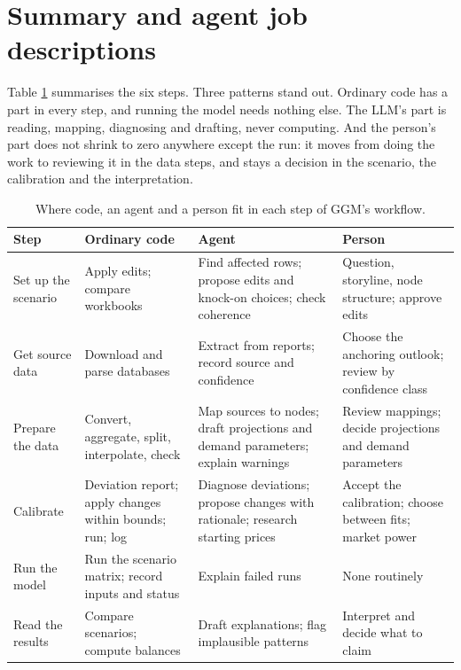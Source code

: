 \section{Summary and agent job descriptions}

Table \ref{tab:where-ai-fits} summarises the six steps.
Three patterns stand out.
Ordinary code has a part in every step, and running the model needs nothing else.
The LLM's part is reading, mapping, diagnosing and drafting, never computing.
And the person's part does not shrink to zero anywhere except the run: it moves from doing the work to reviewing it in the data steps, and stays a decision in the scenario, the calibration and the interpretation.

\begin{table}[htbp]
\centering
\small
\caption{Where code, an agent and a person fit in each step of GGM's workflow.}
\label{tab:where-ai-fits}
\begin{tabularx}{\textwidth}{@{}l>{\raggedright\arraybackslash}X>{\raggedright\arraybackslash}X>{\raggedright\arraybackslash}X@{}}
\toprule
Step & Ordinary code & Agent & Person \\
\midrule
Set up the scenario & Apply edits; compare workbooks & Find affected rows; propose edits and knock-on choices; check coherence & Question, storyline, node structure; approve edits \\
Get source data & Download and parse databases & Extract from reports; record source and confidence & Choose the anchoring outlook; review by confidence class \\
Prepare the data & Convert, aggregate, split, interpolate, check & Map sources to nodes; draft projections and demand parameters; explain warnings & Review mappings; decide projections and demand parameters \\
Calibrate & Deviation report; apply changes within bounds; run; log & Diagnose deviations; propose changes with rationale; research starting prices & Accept the calibration; choose between fits; market power \\
Run the model & Run the scenario matrix; record inputs and status & Explain failed runs & None routinely \\
Read the results & Compare scenarios; compute balances & Draft explanations; flag implausible patterns & Interpret and decide what to claim \\
\bottomrule
\end{tabularx}
\end{table}

